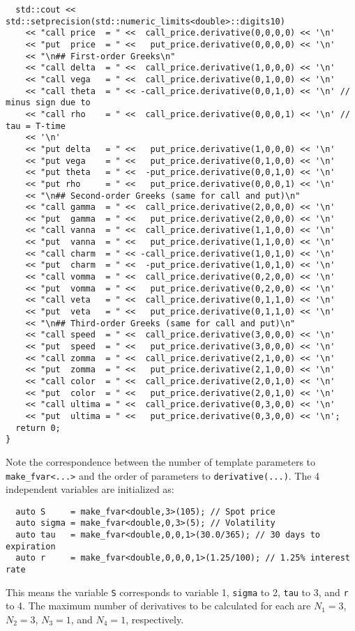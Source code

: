 \documentclass{article}
\begin{document}
\begin{verbatim}
  std::cout << std::setprecision(std::numeric_limits<double>::digits10)
    << "call price  = " <<  call_price.derivative(0,0,0,0) << '\n'
    << "put  price  = " <<   put_price.derivative(0,0,0,0) << '\n'
    << "\n## First-order Greeks\n"
    << "call delta  = " <<  call_price.derivative(1,0,0,0) << '\n'
    << "call vega   = " <<  call_price.derivative(0,1,0,0) << '\n'
    << "call theta  = " << -call_price.derivative(0,0,1,0) << '\n' // minus sign due to
    << "call rho    = " <<  call_price.derivative(0,0,0,1) << '\n' //      tau = T-time
    << '\n'
    << "put delta   = " <<   put_price.derivative(1,0,0,0) << '\n'
    << "put vega    = " <<   put_price.derivative(0,1,0,0) << '\n'
    << "put theta   = " <<  -put_price.derivative(0,0,1,0) << '\n'
    << "put rho     = " <<   put_price.derivative(0,0,0,1) << '\n'
    << "\n## Second-order Greeks (same for call and put)\n"
    << "call gamma  = " <<  call_price.derivative(2,0,0,0) << '\n'
    << "put  gamma  = " <<   put_price.derivative(2,0,0,0) << '\n'
    << "call vanna  = " <<  call_price.derivative(1,1,0,0) << '\n'
    << "put  vanna  = " <<   put_price.derivative(1,1,0,0) << '\n'
    << "call charm  = " << -call_price.derivative(1,0,1,0) << '\n'
    << "put  charm  = " <<  -put_price.derivative(1,0,1,0) << '\n'
    << "call vomma  = " <<  call_price.derivative(0,2,0,0) << '\n'
    << "put  vomma  = " <<   put_price.derivative(0,2,0,0) << '\n'
    << "call veta   = " <<  call_price.derivative(0,1,1,0) << '\n'
    << "put  veta   = " <<   put_price.derivative(0,1,1,0) << '\n'
    << "\n## Third-order Greeks (same for call and put)\n"
    << "call speed  = " <<  call_price.derivative(3,0,0,0) << '\n'
    << "put  speed  = " <<   put_price.derivative(3,0,0,0) << '\n'
    << "call zomma  = " <<  call_price.derivative(2,1,0,0) << '\n'
    << "put  zomma  = " <<   put_price.derivative(2,1,0,0) << '\n'
    << "call color  = " <<  call_price.derivative(2,0,1,0) << '\n'
    << "put  color  = " <<   put_price.derivative(2,0,1,0) << '\n'
    << "call ultima = " <<  call_price.derivative(0,3,0,0) << '\n'
    << "put  ultima = " <<   put_price.derivative(0,3,0,0) << '\n';
  return 0;
}
\end{verbatim}
\endgroup
Note the correspondence between the number of template parameters to {\tt make\_fvar<...>} and the order
of parameters to {\tt derivative(...)}. The 4 independent variables are initialized as:

\begin{verbatim}
  auto S     = make_fvar<double,3>(105); // Spot price
  auto sigma = make_fvar<double,0,3>(5); // Volatility
  auto tau   = make_fvar<double,0,0,1>(30.0/365); // 30 days to expiration
  auto r     = make_fvar<double,0,0,0,1>(1.25/100); // 1.25% interest rate
\end{verbatim}
This means the variable {\tt S} corresponds to variable 1, {\tt sigma} to 2, {\tt tau} to 3, and {\tt r} to 4.
The maximum number of derivatives to be calculated for each are $N_1=3$, $N_2=3$, $N_3=1$, and $N_4=1$, respectively.
\end{document}
